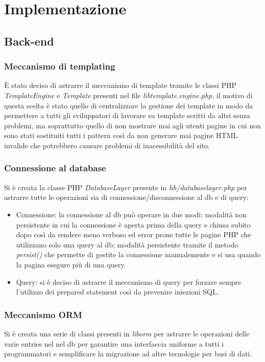 \section{Implementazione}

\subsection{Back-end}

\subsubsection{Meccanismo di templating}
È stato deciso di astrarre il meccanismo di template tramite le classi PHP
\textit{TemplateEngine} e \textit{Template} presenti nel file 
\textit{lib\slshape template.engine.php}, il motivo di questa scelta è stato
quello di centralizzare la gestione dei template in modo da permettere a tutti
gli sviluppatori di lavorare su template scritti da altri senza problemi, ma
soprattutto quello di non mostrare mai agli utenti pagine in cui non sono stati
sostituiti tutti i pattern così da non generare mai pagine HTML invalide che
potrebbero causare problemi di inacessibilità del sito.

\subsubsection{Connessione al database}
Si è creata la classe PHP \textit{DatabaseLayer} presente in
\textit{lib/databaselayer.php} per astrarre tutte le operazioni sia di
connessione/disconnessione al db e di query:
\begin{itemize}
    \item Connessione: la connessione al db può operare in due modi: modalità
        non persistente in cui la connessione è aperta prima della query e
        chiusa subito dopo così da rendere meno verboso ed error prone tutte le
        pagine PHP che utilizzano solo una query al db; modalità persistente
        tramite il metodo \textit{persist()} che permette di gestite la
        connessione manualemente e si usa quando la pagina esegure più di una
        query.
    \item Query: si è deciso di astrarre il meccanismo di query per forzare
        sempre l'utilizzo dei prepared statement così da prevenire iniezioni
        SQL.
\end{itemize}

\subsubsection{Meccanismo ORM}
Si è creata una serie di classi presenti in \textit{lib\slshape orm\slshape}
per astrarre le operazioni delle varie entries nel nel db per garantire una
interfaccia uniforme a tutti i programmatori e semplificare la migrazione ad
altre tecnologie per basi di dati.\\

